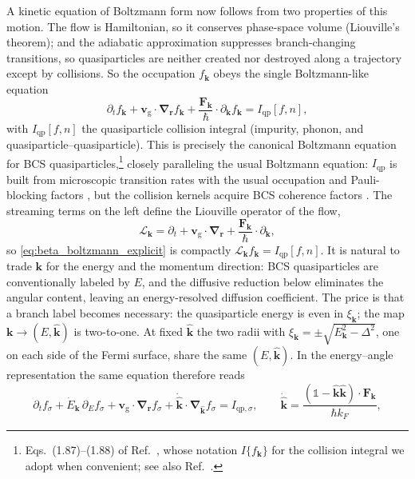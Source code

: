 \documentclass[
  aps,
  prb,
  preprint,
  superscriptaddress,
  longbibliography,
  nofootinbib
]{revtex4-2}
\newcommand{\br}{\mathbf{r}}
\newcommand{\bk}{\mathbf{k}}
\newcommand{\bnabla}{\boldsymbol{\nabla}}
\newcommand{\bF}{\mathbf{F}}
\newcommand{\bvg}{\mathbf{v}_{\mathrm{g}}}
\newcommand{\Iqp}{I_{\mathrm{qp}}}
\providecommand{\openone}{}\renewcommand{\openone}{\mathds{1}}
\begin{document}
A kinetic equation of Boltzmann form now follows from two properties
of this motion. The flow is Hamiltonian, so it conserves phase-space
volume (Liouville's theorem); and the adiabatic approximation
suppresses branch-changing transitions, so quasiparticles are neither
created nor destroyed along a trajectory except by collisions.
So the occupation \(f_{\bk}\) obeys the single Boltzmann-like equation
\begin{equation}
  \partial_t f_{\bk}
  + \bvg\cdot\bnabla_{\br}f_{\bk}
  + \frac{\bF_{\bk}}{\hbar}\cdot\partial_{\bk}f_{\bk}
  = \Iqp[f,n],
  \label{eq:beta_boltzmann_explicit}
\end{equation}
with \(\Iqp[f,n]\) the quasiparticle collision integral (impurity, phonon, and quasiparticle--quasiparticle).
This is precisely the canonical Boltzmann equation for BCS quasiparticles,\footnote{Eqs.~(1.87)--(1.88) of Ref.~, whose notation \(I\{f_{\bk}\}\) for the collision integral we adopt when convenient; see also Ref.~.} closely paralleling the usual Boltzmann equation: \(\Iqp\) is built from microscopic transition rates with the usual occupation and Pauli-blocking factors \cite{ziman1960,ashcroft1976}, but the collision kernels acquire BCS coherence factors \cite{bardeen1959,kaplan1976,changscalapino1977}.
The streaming terms on the left define the Liouville operator of the flow,
\begin{equation}
  \mathcal L_{\bk}
  = \partial_t + \bvg\cdot\bnabla_{\br}
  + \frac{\bF_{\bk}}{\hbar}\cdot\partial_{\bk},
  \label{eq:beta_liouville}
\end{equation}
so \cref{eq:beta_boltzmann_explicit} is compactly
\(\mathcal L_{\bk}f_{\bk}=\Iqp[f,n]\). It is natural to trade
\(\bk\) for the energy and the momentum direction: BCS quasiparticles
are conventionally labeled by \(E\), and the diffusive reduction below
eliminates the angular content, leaving an energy-resolved diffusion
coefficient. The price is that a branch label becomes necessary: the
quasiparticle energy is even in \(\xi_{\bk}\); the map \(\bk\to(E,\hat{\bk})\) is two-to-one.
At fixed
\(\hat{\bk}\) the two radii with
\(\xi_{\bk}=\pm\sqrt{E_{\bk}^{2}-\Delta^2}\),
one on each side of the Fermi surface, share the same \((E,\hat{\bk})\). In the
energy--angle representation the same equation therefore reads
\begin{equation}
  \partial_t f_{\sigma}
  + \dot E_{\bk}\,\partial_E f_{\sigma}
  + \bvg\cdot\bnabla_{\br}f_{\sigma}
  + \dot{\hat{\bk}}\cdot\bnabla_{\hat{\bk}}f_{\sigma}
  = I_{\mathrm{qp},\sigma},
  \qquad
  \dot{\hat{\bk}}
  = \frac{(\openone-\hat{\bk}\hat{\bk})\cdot\bF_{\bk}}{\hbar k_F},
  \label{eq:beta_boltzmann_energy_variables}
\end{equation}
\end{document}
